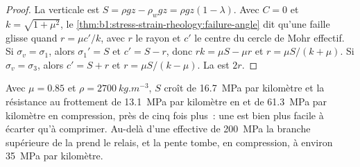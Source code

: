 \begin{proof}
La  verticale est $S = \rho g z - \rho_w g z = \rho g z(1-\lambda)$.
Avec $C = 0$ et $k = \sqrt{1+\mu^2}$, le \cref{thm:b1:stress-strain-rheology:failure-angle}
dit qu'une faille glisse quand $r = \mu c'/k$, avec $r$ le rayon et $c'$ le
centre du cercle de Mohr effectif. Si $\sigma_v = \sigma_1$, alors
$\sigma_1' = S$ et $c' = S - r$, donc $rk = \mu S - \mu r$ et
$r = \mu S/(k+\mu)$. Si $\sigma_v = \sigma_3$, alors $c' = S + r$ et
$r = \mu S/(k-\mu)$. La  est $2r$.
\end{proof}

Avec $\mu = 0.85$ et $\rho = \qty{2700}{kg.m^{-3}}$, $S$ croît de
\qty{16.7}{MPa} par kilomètre et la résistance au frottement de
\qty{13.1}{MPa} par kilomètre en  et de \qty{61.3}{MPa} par
kilomètre en compression, près de cinq fois plus~: une  est bien plus facile à
écarter qu'à comprimer. Au-delà d'une  effective de
\qty{200}{MPa} la branche supérieure de la  prend le relais, et la pente
tombe, en compression, à environ \qty{35}{MPa} par kilomètre.

